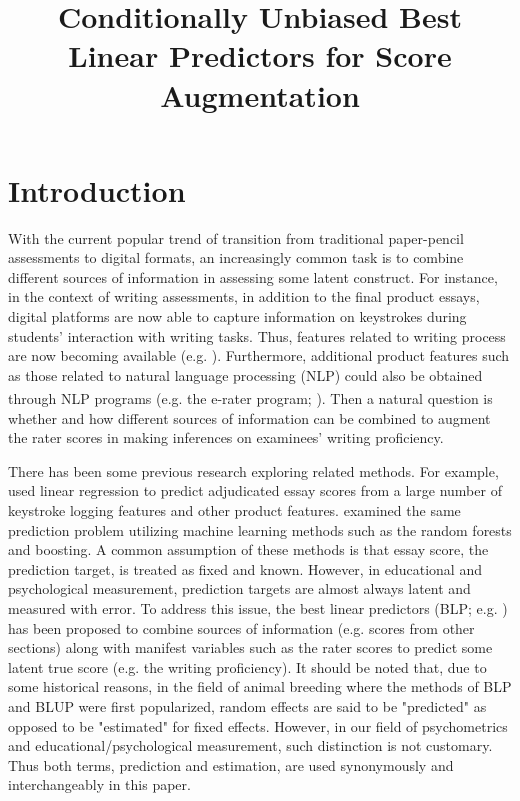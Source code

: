 \documentclass[man, floatsintext]{apa7}
\title{Conditionally Unbiased Best Linear Predictors for Score Augmentation}
\begin{document}
  \maketitle

  \section{Introduction}
	With the current popular trend of transition from traditional paper-pencil
  assessments to digital formats, an increasingly common task is to combine
  different sources of information in assessing some latent construct. For
  instance, in the context of writing assessments, in addition to the final
  product essays, digital platforms are now able to capture information on
  keystrokes during
  students' interaction with writing tasks. Thus, features related to writing
  process are now becoming available (e.g. \cite{Zhang2019,Guo2019}).
  Furthermore, additional product features such as those related to natural
  language processing (NLP) could also be obtained through NLP programs (e.g.
  the e-rater\textsuperscript{\textregistered} program; 
  \cite{Attali2006,Burstein2004}). Then a natural question is whether and how
  different sources of information can be combined to augment the rater
  scores in making inferences on examinees' writing proficiency.

  There has been some previous research exploring related methods. For example,
  \textcite{Zhang2015} used linear regression to predict adjudicated essay
  scores from a large number of keystroke logging features and other product
  features. \textcite{Sinharay2019} examined the same prediction problem
  utilizing machine learning methods such as the random forests and boosting. A
  common assumption of these methods is that essay score, the prediction
  target, is treated as fixed and known. However, in educational and
  psychological measurement, prediction targets are almost always latent and
  measured with error. To address this issue, the best linear predictors (BLP;
  e.g. \cite{Haberman2015,Yao2019}) has been proposed to combine sources of
  information (e.g. scores from other sections) along with manifest variables
  such as the rater scores to predict some latent true score (e.g. the
  writing proficiency). It should be noted that, due to some historical reasons,
  in the field of animal breeding where the methods of BLP and BLUP were first
  popularized, random effects are said to be "predicted" as opposed to be
  "estimated" for fixed effects. However, in our field of psychometrics and
  educational/psychological measurement, such distinction is not customary.
  Thus both terms, prediction and estimation, are used synonymously and
  interchangeably in this paper.
\end{document}
